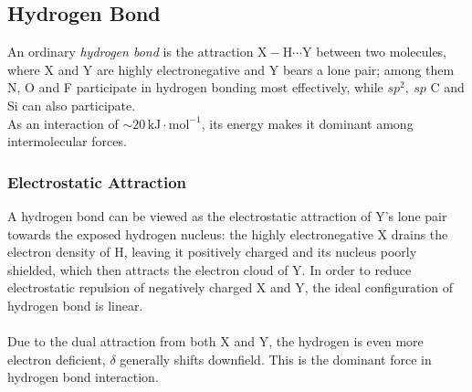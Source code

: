 \subsection{Hydrogen Bond}\label{hbond}

	An ordinary \emph{hydrogen bond} is the attraction $\text{X}-\text{H}\cdots\text{Y}$ between two molecules, where X and Y are highly electronegative and Y bears a lone pair; among them N, O and F participate in hydrogen bonding most effectively, while $sp^2,\ sp$ C and Si can also participate. \\
	As an interaction of $\sim 20\,\text{kJ}\cdot\text{mol}^{-1}$, its energy makes it dominant among intermolecular forces.

	\subsubsection{Electrostatic Attraction}

		A hydrogen bond can be viewed as the electrostatic attraction of Y's lone pair towards the exposed hydrogen nucleus: the highly electronegative X drains the electron density of H, leaving it positively charged and its nucleus poorly shielded, which then attracts the electron cloud of Y. In order to reduce electrostatic repulsion of negatively charged X and Y, the ideal configuration of hydrogen bond is linear.\\ \\
		Due to the dual attraction from both X and Y, the hydrogen is even more electron deficient, $\delta$ generally shifts downfield.
		This is the dominant force in hydrogen bond interaction.


